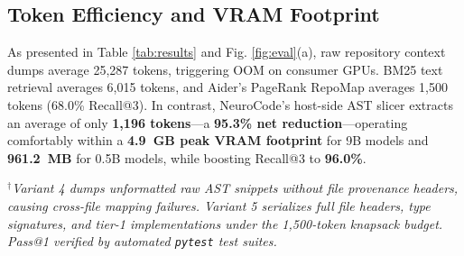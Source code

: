 \documentclass[conference]{IEEEtran}
\begin{document}
\subsection{Token Efficiency and VRAM Footprint}
As presented in Table \ref{tab:results} and Fig. \ref{fig:eval}(a), raw repository context dumps average 25,287 tokens, triggering OOM on consumer GPUs. BM25 text retrieval averages 6,015 tokens, and Aider's PageRank RepoMap averages 1,500 tokens (68.0\% Recall@3). In contrast, NeuroCode's host-side AST slicer extracts an average of only \textbf{1,196 tokens}---a \textbf{95.3\% net reduction}---operating comfortably within a \textbf{4.9~GB peak VRAM footprint} for 9B models and \textbf{961.2~MB} for 0.5B models, while boosting Recall@3 to \textbf{96.0\%}.

\begin{table}[h]
\centering
\caption{Component Ablation and Patch Verification ($N=5$ Multi-Module Bug Benchmark)}
\label{tab:ablation}
\vspace{1mm}
\footnotesize{$^\dagger$\textit{Variant 4 dumps unformatted raw AST snippets without file provenance headers, causing cross-file mapping failures. Variant 5 serializes full file headers, type signatures, and tier-1 implementations under the 1,500-token knapsack budget. Pass@1 verified by automated \texttt{pytest} test suites.}}
\end{table}
\end{document}
